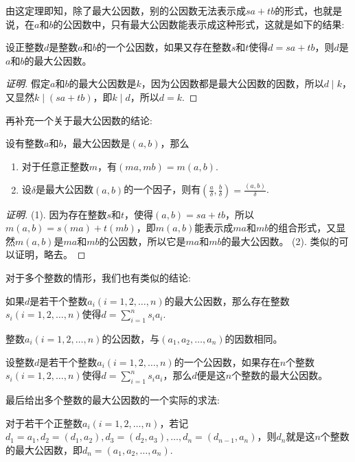 由这定理即知，除了最大公因数，别的公因数无法表示成$sa+tb$的形式，也就是说，在$a$和$b$的公因数中，只有最大公因数能表示成这种形式，这就是如下的结果:
\begin{theorem}
  设正整数$d$是整数$a$和$b$的一个公因数，如果又存在整数$s$和$t$使得$d=sa+tb$，则$d$是$a$和$b$的最大公因数。
\end{theorem}

\begin{proof}[证明]
  假定$a$和$b$的最大公因数是$k$，因为公因数都是最大公因数的因数，所以$d \mid k$，又显然$k \mid (sa+tb)$，即$k \mid d$，所以$d=k$.
\end{proof}

再补充一个关于最大公因数的结论:
\begin{theorem}
  设有整数$a$和$b$，最大公因数是$(a,b)$，那么
  \begin{enumerate}
  \item 对于任意正整数$m$，有$(ma, mb)=m(a,b)$.
  \item 设$\delta$是最大公因数$(a,b)$的一个因子，则有$(\frac{a}{\delta}, \frac{b}{\delta})=\frac{(a,b)}{\delta}$.
  \end{enumerate}
\end{theorem}

\begin{proof}[证明]
  (1). 因为存在整数$s$和$t$，使得$(a,b)=sa+tb$，所以$m(a,b)=s(ma)+t(mb)$，即$m(a,b)$能表示成$ma$和$mb$的组合形式，又显然$m(a,b)$是$ma$和$mb$的公因数，所以它是$ma$和$mb$的最大公因数。
  (2). 类似的可以证明，略去。
\end{proof}

对于多个整数的情形，我们也有类似的结论:
\begin{theorem}
  如果$d$是若干个整数$a_i(i=1,2,\ldots,n)$的最大公因数，那么存在整数$s_i(i=1,2,\ldots,n)$使得$d=\sum_{i=1}^n s_ia_i$.
\end{theorem}

\begin{inference}
  整数$a_i(i=1,2,\ldots,n)$的公因数，与$(a_1,a_2,\ldots,a_n)$的因数相同。
\end{inference}

\begin{theorem}
  设整数$d$是若干个整数$a_i(i=1,2,\ldots,n)$的一个公因数，如果存在$n$个整数$s_i(i=1,2,\ldots,n)$使得$d=\sum_{i=1}^n s_ia_i$，那么$d$便是这$n$个整数的最大公因数。
\end{theorem}

最后给出多个整数的最大公因数的一个实际的求法:
\begin{theorem}
  对于若干个正整数$a_i(i=1,2,\ldots,n)$，若记$d_1=a_1, d_2=(d_1,a_2), d_3=(d_2, a_3),\ldots,d_n=(d_{n-1},a_n)$，则$d_n$就是这$n$个整数的最大公因数，即$d_n=(a_1,a_2,\ldots,a_n)$.
\end{theorem}


